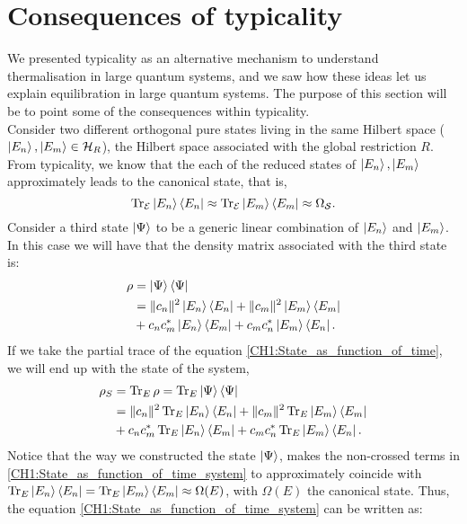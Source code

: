 \section{Consequences of typicality}
We presented typicality as an alternative mechanism to understand thermalisation in large quantum systems, and we saw how these ideas let us explain equilibration in large quantum systems. The purpose of this section will be to point some of the consequences within typicality.\\
\indent Consider two different orthogonal pure states living in the same Hilbert space ($\mathinner{|{E_n}\rangle},\mathinner{|{E_m}\rangle} \in \mathcal{H}_{R}$), the Hilbert space associated with the global restriction $R$. From typicality, we know that the each of the reduced states of $\mathinner{|{E_n}\rangle},\mathinner{|{E_m}\rangle}$ approximately leads to the canonical state, that is,
\begin{equation}
\operatorname{Tr}_{\mathcal{E}} \mathinner{|{E_n}\rangle}\mathinner{\langle{E_n}|} \approx \operatorname{Tr}_{\mathcal{E}} \mathinner{|{E_m}\rangle}\mathinner{\langle{E_m}|} \approx \Omega_{\mathcal{S}}.
\end{equation}
Consider a third state $\mathinner{|{\Psi}\rangle}$ to be a generic linear combination of $\mathinner{|{E_n}\rangle}$ and $\mathinner{|{E_m}\rangle}$. In this case we will have that the density matrix associated with the third state is:
\begin{equation}
\begin{aligned}
\rho &= \mathinner{|{\Psi}\rangle}\mathinner{\langle{\Psi}|}\\
&= \|c_n\|^2 \mathinner{|{E_n}\rangle}\mathinner{\langle{E_n}|} +  \|c_m\|^2 \mathinner{|{E_m}\rangle}\mathinner{\langle{E_m}|} \\
& + c_n c^{*}_m  \mathinner{|{E_n}\rangle}\mathinner{\langle{E_m}|}+ c_m c^{*}_n \mathinner{|{E_m}\rangle}\mathinner{\langle{E_n}|}.
\end{aligned}
\label{CH1:State_as_function_of_time}
\end{equation}
If we take the partial trace of the equation \eqref{CH1:State_as_function_of_time}, we will end up with the state of the system,
\begin{equation}
\begin{aligned}
\rho_S &= \operatorname{Tr}_E \rho = \operatorname{Tr}_E  \mathinner{|{\Psi}\rangle}\mathinner{\langle{\Psi}|}\\
&= \|c_n\|^2\operatorname{Tr}_E  \mathinner{|{E_n}\rangle}\mathinner{\langle{E_n}|} +  \|c_m\|^2 \operatorname{Tr}_E \mathinner{|{E_m}\rangle}\mathinner{\langle{E_m}|} \\
& + c_n c^{*}_m  \operatorname{Tr}_E \mathinner{|{E_n}\rangle}\mathinner{\langle{E_m}|} + c_m c^{*}_n \operatorname{Tr}_E \mathinner{|{E_m}\rangle}\mathinner{\langle{E_n}|}.
\end{aligned}
\label{CH1:State_as_function_of_time_system}
\end{equation}
\indent  Notice that the way we constructed the state $\mathinner{|{\Psi}\rangle}$, makes the non-crossed terms in \eqref{CH1:State_as_function_of_time_system} to approximately  coincide with $\operatorname{Tr}_E \mathinner{|{E_n}\rangle}\mathinner{\langle{E_n}|} =\operatorname{Tr}_E \mathinner{|{E_m}\rangle}\mathinner{\langle{E_m}|} \approx \Omega(E)$, with $\Omega(E)$ the canonical state. Thus, the equation \eqref{CH1:State_as_function_of_time_system} can be written as:

